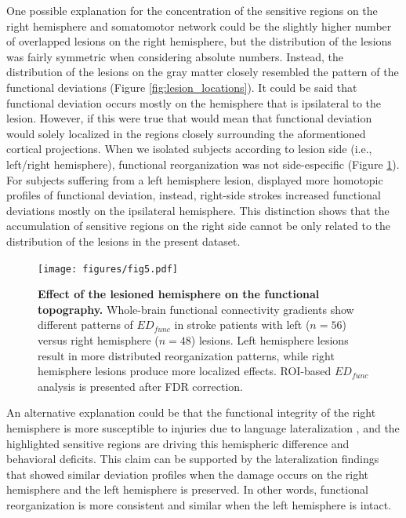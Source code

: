 \documentclass[fleqn,10pt]{wlscirep}
\begin{document}
One possible explanation for the concentration of the sensitive regions on the right hemisphere and somatomotor network could be the slightly higher number of overlapped lesions on the right hemisphere, but the distribution of the lesions was fairly symmetric when considering absolute numbers. Instead, the distribution of the lesions on the gray matter closely resembled the pattern of the functional deviations (Figure \ref{fig:lesion_locations}). It could be said that functional deviation occurs mostly on the hemisphere that is ipsilateral to the lesion. However, if this were true that would mean that functional deviation would solely localized in the regions closely surrounding the aformentioned cortical projections. When we isolated subjects according to lesion side (i.e., left/right hemisphere), functional reorganization was not side-especific (Figure \ref{fig:damage_on_separate}). For subjects suffering from a left hemisphere lesion, displayed more homotopic profiles of functional deviation, instead, right-side strokes increased functional deviations mostly on the ipsilateral hemisphere. This distinction shows that the accumulation of sensitive regions on the right side cannot be only related to the distribution of the lesions in the present dataset. 

\begin{figure}[]
\centering
\texttt{[image: figures/fig5.pdf]}
\caption{\label{fig:damage_on_separate} \textbf{Effect of the lesioned hemisphere on the functional topography.} Whole-brain functional connectivity gradients show different patterns of $\textit{ED}_{{func}}$ in stroke patients with left ($n =56$) versus right hemisphere ($n = 48$) lesions. Left hemisphere lesions result in more distributed reorganization patterns, while right hemisphere lesions produce more localized effects. ROI-based $\textit{ED}_{{func}}$ analysis is presented after FDR correction.}
\end{figure}

An alternative explanation could be that the functional integrity of the right hemisphere is  more susceptible to injuries due to language lateralization \citep{hodgson2014role}, and the highlighted sensitive regions are driving this hemispheric difference and behavioral deficits. This claim can be supported by the lateralization findings that showed similar deviation profiles when the damage occurs on the right hemisphere and the left hemisphere is preserved. In other words, functional reorganization is more consistent and similar when the left hemisphere is intact.
\end{document}
